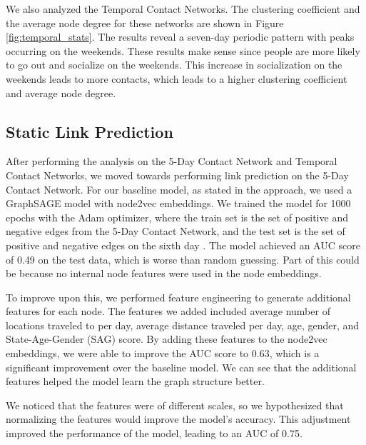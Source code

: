 \documentclass[times, 10pt,twocolumn]{article}
\begin{document}
We also analyzed the Temporal Contact Networks. The clustering coefficient and the average node degree for these networks are shown in Figure \ref{fig:temporal_stats}. The results reveal a seven-day periodic pattern with peaks occurring on the weekends. These results make sense since people are more likely to go out and socialize on the weekends. This increase in socialization on the weekends leads to more contacts, which leads to a higher clustering coefficient and average node degree.

\subsection{Static Link Prediction}
After performing the analysis on the 5-Day Contact Network and Temporal Contact Networks, we moved towards performing link prediction on the 5-Day Contact Network. For our baseline model, as stated in the approach, we used a GraphSAGE model with node2vec embeddings. We trained the model for 1000 epochs with the Adam optimizer, where the train set is the set of positive and negative edges from the 5-Day Contact Network, and the test set is the set of positive and negative edges on the sixth day \cite{kingma2017adam}. The model achieved an AUC score of 0.49 on the test data, which is worse than random guessing. Part of this could be because no internal node features were used in the node embeddings.

To improve upon this, we performed feature engineering to generate additional features for each node. The features we added included average number of locations traveled to per day, average distance traveled per day, age, gender, and State-Age-Gender (SAG) score. By adding these features to the node2vec embeddings, we were able to improve the AUC score to 0.63, which is a significant improvement over the baseline model. We can see that the additional features helped the model learn the graph structure better. 


We noticed that the features were of different scales, so we hypothesized that normalizing the features would improve the model's accuracy. This adjustment improved the performance of the model, leading to an AUC of 0.75.
\end{document}
